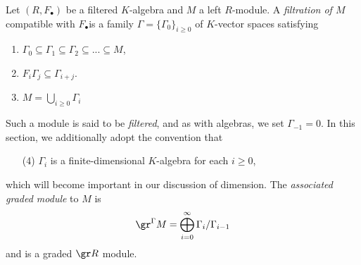 \begin{defn}\label{defn:filtered-module}
	Let $(R,F_\bullet)$ be a filtered $K$-algebra and $M$ a left $R$-module. A \emph{filtration of $M$} compatible with $F_\bullet$is a family $\Gamma = \{\Gamma_0\}_{i\geq 0}$ of $K$-vector spaces satisfying
	\begin{enumerate}[(1)]
		\item $\Gamma_0 \subseteq \Gamma_1 \subseteq \Gamma_2 \subseteq ... \subseteq M$,
		\item $F_i\Gamma_j \subseteq \Gamma_{i+j}$.
		\item $M = \bigcup_{i\geq 0} \Gamma_i$
	\end{enumerate}
	Such a module is said to be \emph{filtered}, and as with algebras, we set $\Gamma_{-1} = 0$. In this section, we additionally adopt the convention that
	\begin{enumerate}
		\item[(4)] $\Gamma_i$ is a finite-dimensional $K$-algebra for each $i \geq 0$,
	\end{enumerate}
	which will become important in our discussion of dimension. The \emph{associated graded module} to $M$ is
	\begin{align*}
		\gr^{\Gamma} M = \bigoplus_{i=0}^\infty \Gamma_i/\Gamma_{i-1}
	\end{align*}
	and is a graded $\gr R$ module.
\end{defn}

